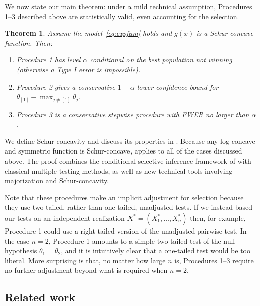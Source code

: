 \documentclass[aos, authoryear]{imsart}
\newtheorem{theorem}[corollary]{Theorem}
\theoremstyle{definition}
\theoremstyle{custom}
\begin{document}
We now state our main theorem: under a mild technical assumption, Procedures 1--3 described above are statistically valid, even accounting for the selection.
\begin{theorem}
\label{thm:main}
Assume the model~\eqref{eq:expfam} holds and $g\left(x\right)$ is a Schur-concave function. Then:
\begin{enumerate}
\item Procedure 1 has level $\alpha$ conditional on the best population not winning (otherwise a Type I error is impossible).
\item Procedure 2 gives a conservative $1-\alpha$ lower confidence bound for $\theta_{[1]} - \max_{j \ne [1]} \theta_{j}$.
\item Procedure 3 is a conservative stepwise procedure with FWER no larger than $\alpha$.
\end{enumerate}
\end{theorem}

We define Schur-concavity and discuss its properties in . Because any log-concave and symmetric function is Schur-concave,  applies to all of the cases discussed above. The proof combines the conditional selective-inference framework of \citet{Fithian:2014ws} with classical multiple-testing methods, as well as new technical tools involving majorization and Schur-concavity.

Note that these procedures make an implicit adjustment for selection because they use two-tailed, rather than one-tailed, unadjusted tests. If we instead based our tests on an independent realization $X^* = (X_1^*, \ldots, X_n^*)$ then, for example, Procedure 1 could use a right-tailed version of the unadjusted pairwise test. In the case $n = 2$, Procedure 1 amounts to a simple two-tailed test of the null hypothesis $\theta_1 = \theta_2$, and it is intuitively clear that a one-tailed test would be too liberal. More surprising is that, no matter how large $n$ is, Procedures 1--3 require no further adjustment beyond what is required when $n = 2$. 

\subsection{Related work}
\end{document}
